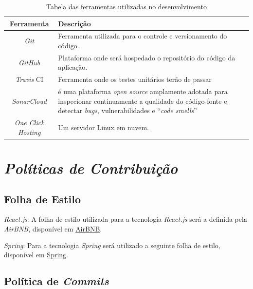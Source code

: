 \begin{apendicesenv}
\begin{table}[H]
    \centering
    \caption{Tabela das ferramentas utilizadas no desenvolvimento}
    \begin{tabularx}{\textwidth}{|c|X|c|}
        \hline
        \rowcolor[HTML]{A8DADC}
        \textbf{Ferramenta} & \textbf{Descrição} \\ \hline
        
        \textit{Git} & Ferramenta utilizada para o controle e versionamento do código.\\\hline
        
        \textit{GitHub} & Plataforma onde será hospedado o repositório do código da aplicação. \\ \hline
        
        \textit{Travis} CI & Ferramenta onde os testes unitários terão de passar\\ \hline
        
        \textit{SonarCloud} &  é uma plataforma \textit{open source} amplamente adotada para inspecionar continuamente a qualidade do código-fonte e detectar \textit{bugs}, vulnerabilidades e ``\textit{code smells}''\\ \hline
        
        \textit{One Click Hosting} & Um servidor Linux em nuvem.\\ \hline
    \end{tabularx}
\end{table}

\section{\textit{Políticas de Contribuição}}
\subsection*{Folha de Estilo}
\textit{React.js}: A folha de estilo utilizada para a tecnologia \textit{React.js} será a definida pela \textit{AirBNB}, disponível em \href{https://github.com/ronal2do/airbnb-react-styleguide}{AirBNB}.
 
\textit{Spring}: Para a tecnologia \textit{Spring} será utilizado a seguinte folha de estilo, disponível em  \href{https://github.com/spring-projects/spring-framework/wiki/Code-Style}{Spring}.

\subsection*{Política de \textit{Commits}}


\end{apendicesenv}
